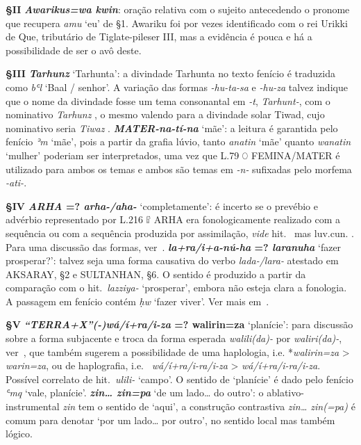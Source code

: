 \smallskip
\noindent\textbf{§II}\tabto{2em}
\textbf{\emph{Awarikus=wa kwin}}: oração relativa com o sujeito antecedendo o
pronome que recupera \emph{amu} `eu' de §1. Awariku foi por vezes
identificado com o rei Urikki de Que, tributário de Tiglate-pileser III\@,
mas a evidência é pouca e há a possibilidade de ser o avô deste.

\smallskip
\noindent\textbf{§III}\tabto{2em}
\textbf{\emph{Tarhunz}} `Tarhunta': a divindade Tarhunta no texto fenício é
traduzida como \emph{bʿl} `Baal \slash{} senhor'.
A variação das formas \emph{-hu-ta-sa} e
\emph{-hu-za} talvez indique que o nome da divindade fosse
um tema consonantal em \emph{-t}, \emph{Tarhunt-}, com o nominativo
\emph{Tarhunz} , o mesmo valendo para a divindade solar Tiwad,
cujo nominativo seria \emph{Tiwaz} .
\textbf{\emph{\emph{MATER}-na-tí-na}} `mãe': a leitura é garantida pelo fenício
\emph{ʾm} `mãe', pois a partir da grafia lúvio, tanto \emph{anatin} `mãe'
quanto \emph{wanatin} `mulher' poderiam ser interpretados, uma vez que L.79 𔑘
FEMINA\slash{}MATER é utilizado para ambos os temas e ambos são temas em
\emph{-n-} sufixadas pelo morfema \emph{-ati-}.

\smallskip
\noindent\textbf{§IV}\tabto{2em}
\textbf{\emph{ARHA} {=?} \emph{arha-/aha-}} `completamente': é incerto se o
prevébio e advérbio representado por L.216 𔓸 ARHA era fonologicamente realizado
com a sequência  ou com a sequência  produzida por
assimilação, \emph{vide} hit.\ \emph{} mas luv.cun.
\emph{}. Para uma discussão das formas,
ver~\citet{Yakubovich2012}.
\textbf{\emph{la+ra/i+a-nú-ha} {=?} \emph{laranuha}} `fazer prosperar?': talvez
seja uma forma causativa do verbo \emph{lada-\slash{}lara-} atestado em
AKSARAY, §2 e SULTANHAN, §6. O sentido é produzido a partir da comparação com o
hit.\ \emph{lazziya-} `prosperar', embora não esteja clara a fonologia.
A passagem em fenício contém \emph{ḥw} `fazer viver'.
Ver mais em~\citet[104--5]{HawkinsMorpurgo1978}.

\smallskip
\noindent\textbf{§V}\tabto{2em}
\textbf{\emph{\emph{“TERRA+X”}{(-)}wá/í+ra/i-za} {=?} walirin=za} `planície':
para discussão sobre a forma subjacente e troca da forma esperada
\emph{walili{(da)}-} por \emph{waliri{(da)}-},
ver~\citet[106]{HawkinsMorpurgo1978}, que também sugerem a possibilidade de
uma haplologia, i.e. *\emph{walirin=za} >
\emph{warin=za}, ou de haplografia, i.e.\ 
\emph{wá/í+ra/i-ra/i-za} >  \emph{wá/í+ra/i-ra/i-za}.
Possível correlato de hit.\ \emph{ulili-} `campo'.
O sentido de `planície' é dado pelo fenício
\emph{ʿmq} `vale, planície'.
\textbf{\emph{zin\ldots{} zin=pa}} `de um lado\ldots{} do outro': o
ablativo-instrumental \emph{zin} tem o sentido de `aqui', a construção
contrastiva \emph{zin\ldots{} zin{(=pa)}} é comum para denotar `por um
lado\ldots{} por outro', no sentido local mas também lógico.



